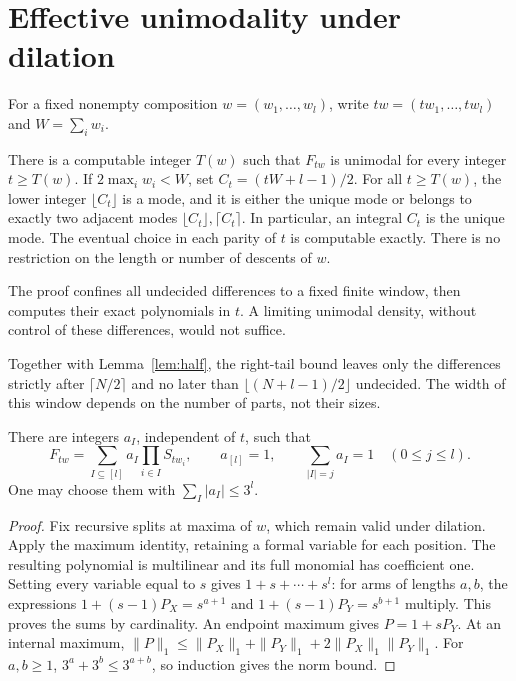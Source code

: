 \section{Effective unimodality under dilation}\label{sec:dilation}

For a fixed nonempty composition $w=(w_1,\ldots,w_l)$, write
$tw=(tw_1,\ldots,tw_l)$ and $W=\sum_iw_i$.

\begin{theorem}\label{thm:dilation}
There is a computable integer $T(w)$ such that $F_{tw}$ is unimodal
for every integer $t\ge T(w)$.
If $2\max_iw_i<W$, set $C_t=(tW+l-1)/2$. For all $t\ge T(w)$,
the lower integer $\lfloor C_t\rfloor$ is a mode, and it is either
the unique mode or belongs to exactly two adjacent modes
$\lfloor C_t\rfloor,\lceil C_t\rceil$.
In particular, an integral $C_t$ is the unique mode.
The eventual choice in each parity of $t$ is computable exactly.
There is no restriction on the length or number of descents of $w$.
\end{theorem}

The proof confines all undecided differences to a fixed finite window,
then computes their exact polynomials in $t$. A limiting unimodal
density, without control of these differences, would not suffice.



Together with Lemma~\ref{lem:half}, the right-tail bound leaves only
the differences strictly after $\lceil N/2\rceil$ and no later than
$\lfloor(N+l-1)/2\rfloor$ undecided. The width of this window depends
on the number of parts, not their sizes.

\begin{lemma}\label{lem:multilinear}
There are integers $a_I$, independent of $t$, such that
\[
 F_{tw}=\sum_{I\subseteq[l]}a_I\prod_{i\in I}S_{tw_i},
 \qquad a_{[l]}=1,\qquad
 \sum_{|I|=j}a_I=1\quad(0\le j\le l).
\]
One may choose them with $\sum_I|a_I|\le3^l$.
\end{lemma}
\begin{proof}
Fix recursive splits at maxima of $w$, which remain valid under
dilation. Apply the maximum identity, retaining a formal variable for
each position. The resulting polynomial is multilinear and its full
monomial has coefficient one. Setting every variable equal to $s$
gives $1+s+\cdots+s^l$: for arms of lengths $a,b$, the expressions
$1+(s-1)P_X=s^{a+1}$ and $1+(s-1)P_Y=s^{b+1}$ multiply.
This proves the sums by cardinality.
An endpoint maximum gives $P=1+sP_Y$. At an internal maximum,
$\|P\|_1\le\|P_X\|_1+\|P_Y\|_1+2\|P_X\|_1\|P_Y\|_1$.
For $a,b\ge1$, $3^a+3^b\le3^{a+b}$, so induction gives the norm bound.
\end{proof}

